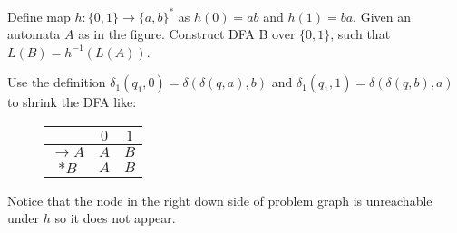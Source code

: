 \documentclass[10pt]{homework}
\begin{document}

\begin{problem}
  Define map $h: \{0, 1\} \rightarrow {\{a, b\}}^*$ as $h(0) = ab$ and
  $h(1) = ba$.
  Given an automata $A$ as in the figure.
  Construct DFA B over $\{0,1\}$, such that $L(B) = h^{-1}(L(A))$.

  \begin{figure}[H]
    \centering
  \end{figure}
\end{problem}

\begin{solution}
    Use the definition $\delta_1(q_1,0)=\delta(\delta(q,a),b)$ and $\delta_1(q_1,1)=\delta(\delta(q,b),a)$ to shrink the DFA like:
    \begin{figure}[htbp]
        \centering
        \begin{tabular}{c||c|c}
             & $0$ & $1$ \\\hline\hline
             $\rightarrow A$ & $A$ & $B$ \\
             $*B$ & $A$ & $B$ \\
        \end{tabular}
    \end{figure}

    Notice that the node in the right down side of problem graph is unreachable under $h$ so it does not appear.
\end{solution}
\end{document}
